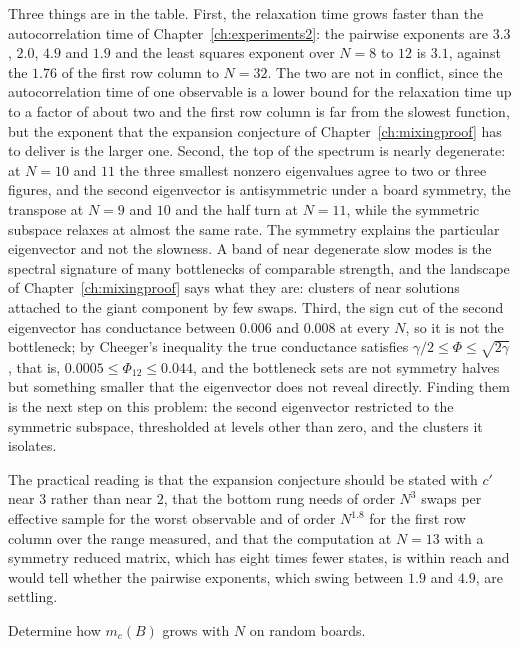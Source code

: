 Three things are in the table. First, the relaxation time grows faster than the autocorrelation time of Chapter~\ref{ch:experiments2}: the pairwise exponents are $3.3$, $2.0$, $4.9$ and $1.9$ and the least squares exponent over $N = 8$ to $12$ is $3.1$, against the $1.76$ of the first row column to $N = 32$. The two are not in conflict, since the autocorrelation time of one observable is a lower bound for the relaxation time up to a factor of about two and the first row column is far from the slowest function, but the exponent that the expansion conjecture of Chapter~\ref{ch:mixingproof} has to deliver is the larger one. Second, the top of the spectrum is nearly degenerate: at $N = 10$ and $11$ the three smallest nonzero eigenvalues agree to two or three figures, and the second eigenvector is antisymmetric under a board symmetry, the transpose at $N = 9$ and $10$ and the half turn at $N = 11$, while the symmetric subspace relaxes at almost the same rate. The symmetry explains the particular eigenvector and not the slowness. A band of near degenerate slow modes is the spectral signature of many bottlenecks of comparable strength, and the landscape of Chapter~\ref{ch:mixingproof} says what they are: clusters of near solutions attached to the giant component by few swaps. Third, the sign cut of the second eigenvector has conductance between $0.006$ and $0.008$ at every $N$, so it is not the bottleneck; by Cheeger's inequality the true conductance satisfies $\gamma / 2 \le \Phi \le \sqrt{2 \gamma}$, that is, $0.0005 \le \Phi_{12} \le 0.044$, and the bottleneck sets are not symmetry halves but something smaller that the eigenvector does not reveal directly. Finding them is the next step on this problem: the second eigenvector restricted to the symmetric subspace, thresholded at levels other than zero, and the clusters it isolates.

The practical reading is that the expansion conjecture should be stated with $c'$ near $3$ rather than near $2$, that the bottom rung needs of order $N^3$ swaps per effective sample for the worst observable and of order $N^{1.8}$ for the first row column over the range measured, and that the computation at $N = 13$ with a symmetry reduced matrix, which has eight times fewer states, is within reach and would tell whether the pairwise exponents, which swing between $1.9$ and $4.9$, are settling.

\begin{problem}
Determine how $m_c(B)$ grows with $N$ on random boards.
\end{problem}

